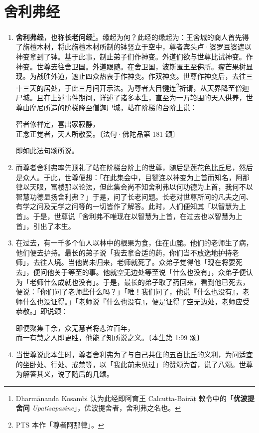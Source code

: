 \section{舍利弗经}

\begin{enumerate}\item \textbf{舍利弗经}，也称\textbf{长老问经}\footnote{Dharmānanda Kosambi 认为此经即阿育王 Calcutta-Bairāṭ 敕令中的「\textbf{优波提舍问} \textit{Upatisapasine}」，优波提舍者，舍利弗之名也。}。缘起为何？此经的缘起为：王舍城的商人首先得了旃檀木材，将此旃檀木材所制的钵竖立于空中，尊者宾头卢·婆罗豆婆遮以神变拿到了钵。基于此事，制止弟子们作神变。外道们欲与世尊比试神变。作神变。世尊去往舍卫国。外道跟随。在舍卫国，波斯匿王至佛所。瘤芒果树显现。为战胜外道，遮止四众热衷于作神变。作双神变。世尊作神变后，去往三十三天的居处，于此三月间开示法。为尊者大目犍连\footnote{PTS 本作「尊者阿那律」。}祈请，从天界降至僧迦尸城。且在上述事件期间，详述了诸多本生，直至为一万轮围的天人供养，世尊由摩尼所造的阶梯降至僧迦尸城，站在阶梯的台阶上说：\begin{quoting}智者修禅定，喜出家寂静，\\正念正觉者，天人所敬爱。{\bluefootnotesize 〔法句·佛陀品第 181 颂〕}\end{quoting}即如此法句颂所说。
\item 而尊者舍利弗率先顶礼了站在阶梯台阶上的世尊，随后是莲花色比丘尼，然后是众人。于此，世尊便想：「在此集会中，目犍连以神变为上首而知名，阿那律以天眼，富楼那以论法，但此集会尚不知舍利弗以何功德为上首，我何不以智慧功德显扬舍利弗？」于是，问了长老问题。长老对世尊所问的凡夫之问、有学之问及无学之问等的一切皆作了解答。此时，人们便知其「以智慧为上首」。于是，世尊说「舍利弗不唯现在以智慧为上首，在过去也以智慧为上首」，引出了本生。
\item 在过去，有一千多个仙人以林中的根果为食，住在山麓。他们的老师生了病，他们便去护持。最长的弟子说「我去拿合适的药，你们当不放逸地护持老师」，去往人境。当他尚未归来，老师就死了。众弟子觉得他「现在将要死去」，便问他关于等至的事。他就空无边处等至说「什么也没有」，众弟子便认为「老师什么成就也没有」。于是，最长的弟子取了药回来，看到他已死去，便说：「你们问了老师些什么吗？」「唯！我们问了，他说『什么也没有』，老师什么也没证得。」「老师说『什么也没有』，便是证得了空无边处，老师应受恭敬。」即说颂：\begin{quoting}即便聚集千余，众无慧者将悲泣百年，\\而一有慧之人即更胜，他能了知所说之义。{\bluefootnotesize 〔本生第 1:99 颂〕}\end{quoting}
\item 当世尊说此本生时，尊者舍利弗为了与自己共住的五百比丘的义利，为问适宜的坐卧处、行处、戒禁等，以「我此前未见过」的赞颂为首，说了八颂。世尊为解答其义，说了随后的几颂。\end{enumerate}

